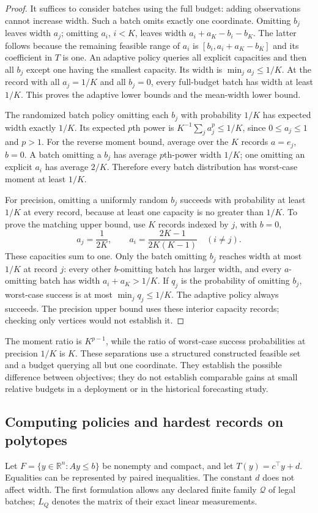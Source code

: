 \documentclass[12pt]{article}
\begin{document}
\begin{proof}
It suffices to consider batches using the full budget: adding observations
cannot increase width. Such a batch omits exactly one coordinate.
Omitting $b_j$ leaves width $a_j$; omitting $a_i$, $i<K$, leaves width
$a_i+a_K-b_i-b_K$. The latter follows because the remaining feasible
range of $a_i$ is $[b_i,a_i+a_K-b_K]$ and its coefficient in $T$ is one.
An adaptive policy queries all explicit capacities and then all $b_j$
except one having the smallest capacity. Its width is
$\min_j a_j\le1/K$. At the record with all $a_j=1/K$ and all $b_j=0$,
every full-budget batch has width at least $1/K$. This proves the
adaptive lower bounds and the mean-width lower bound.

The randomized batch policy omitting each $b_j$ with probability $1/K$
has expected width exactly $1/K$. Its expected $p$th power is
$K^{-1}\sum_j a_j^p\le1/K$, since $0\le a_j\le1$ and $p>1$.
For the reverse moment bound, average over the $K$ records
$a=e_j$, $b=0$. A batch omitting a $b_j$ has average $p$th-power width
$1/K$; one omitting an explicit $a_i$ has average $2/K$.
Therefore every batch distribution has worst-case moment at least $1/K$.

For precision, omitting a uniformly random $b_j$ succeeds with
probability at least $1/K$ at every record, because at least one capacity
is no greater than $1/K$. To prove the matching upper bound, use $K$
records indexed by $j$, with $b=0$,
\[
 a_j=\frac{1}{2K},\qquad
 a_i=\frac{2K-1}{2K(K-1)}\quad(i\ne j).
\]
These capacities sum to one. Only the batch omitting $b_j$ reaches
width at most $1/K$ at record $j$: every other $b$-omitting batch has larger
width, and every $a$-omitting batch has width $a_i+a_K>1/K$.
If $q_j$ is the probability of omitting $b_j$, worst-case success is
at most $\min_j q_j\le1/K$. The adaptive policy always succeeds.
The precision upper bound uses these interior capacity records;
checking only vertices would not establish it.
\end{proof}

The moment ratio is $K^{p-1}$, while the ratio of worst-case success
probabilities at precision $1/K$ is $K$. These separations use a
structured constructed feasible set and a budget querying all but one
coordinate. They establish the possible difference between objectives;
they do not establish comparable gains at small relative budgets in a
deployment or in the historical forecasting study.
\subsection{Computing policies and hardest records on polytopes}\label{sec:general-algorithms}
Let $F=\{y\in\mathbb R^n:Ay\le b\}$ be nonempty and compact, and let
$T(y)=c^\top y+d$. Equalities can be represented by paired inequalities.
The constant $d$ does not affect width. The first formulation allows any
declared finite family $\mathcal Q$ of legal batches; $L_Q$ denotes the matrix
of their exact linear measurements.
\end{document}
